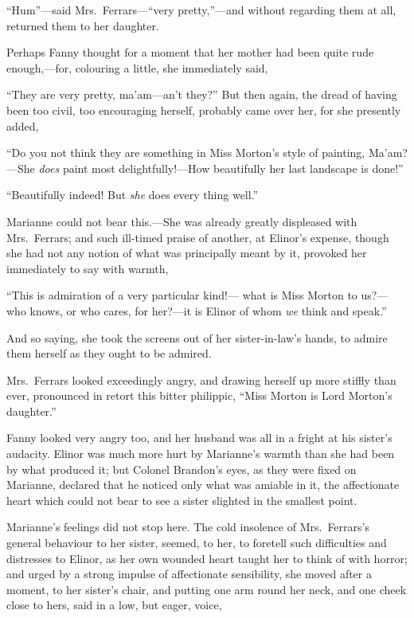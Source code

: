 ``Hum''---said Mrs.\ Ferrars---``very pretty,''---and without
regarding them at all, returned them to her daughter.

Perhaps Fanny thought for a moment that her mother
had been quite rude enough,---for, colouring a little,
she immediately said,

``They are very pretty, ma'am---an't they?'' But then again,
the dread of having been too civil, too encouraging herself,
probably came over her, for she presently added,

``Do you not think they are something in Miss
Morton's style of painting, Ma'am?---She \emph{does} paint most
delightfully!---How beautifully her last landscape is done!''

``Beautifully indeed!  But \emph{she} does every thing well.''

Marianne could not bear this.---She was already
greatly displeased with Mrs.\ Ferrars; and such ill-timed
praise of another, at Elinor's expense, though she
had not any notion of what was principally meant by it,
provoked her immediately to say with warmth,

``This is admiration of a very particular kind!---%
what is Miss Morton to us?---who knows, or who cares,
for her?---it is Elinor of whom \emph{we} think and speak.''

And so saying, she took the screens out of her
sister-in-law's hands, to admire them herself as they
ought to be admired.

Mrs.\ Ferrars looked exceedingly angry, and drawing
herself up more stiffly than ever, pronounced in retort
this bitter philippic, ``Miss Morton is Lord Morton's daughter.''

Fanny looked very angry too, and her husband was
all in a fright at his sister's audacity.  Elinor was
much more hurt by Marianne's warmth than she had been
by what produced it; but Colonel Brandon's eyes, as they
were fixed on Marianne, declared that he noticed only
what was amiable in it, the affectionate heart which could
not bear to see a sister slighted in the smallest point.

Marianne's feelings did not stop here.  The cold
insolence of Mrs.\ Ferrars's general behaviour to her sister,
seemed, to her, to foretell such difficulties and distresses
to Elinor, as her own wounded heart taught her to think
of with horror; and urged by a strong impulse of
affectionate sensibility, she moved after a moment,
to her sister's chair, and putting one arm round her neck,
and one cheek close to hers, said in a low, but eager,
voice,


